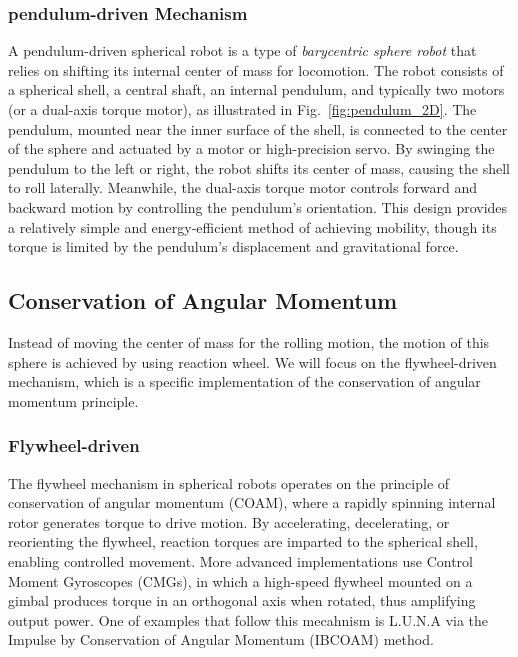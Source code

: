 \documentclass[english, bachelor, utf8]{base/thesis_telematics}
\begin{document}
\subsubsection{pendulum-driven Mechanism}
A pendulum-driven spherical robot is a type of \textit{barycentric sphere robot} that relies on shifting its internal center of mass for locomotion. 
The robot consists of a spherical shell, a central shaft, an internal pendulum, and typically two motors (or a dual-axis torque motor), as illustrated in Fig.~\ref{fig:pendulum_2D}. 
The pendulum, mounted near the inner surface of the shell, is connected to the center of the sphere and actuated by a motor or high-precision servo. 
By swinging the pendulum to the left or right, the robot shifts its center of mass, causing the shell to roll laterally. 
Meanwhile, the dual-axis torque motor controls forward and backward motion by controlling the pendulum’s orientation. 
This design provides a relatively simple and energy-efficient method of achieving mobility, though its torque is limited by the pendulum’s displacement and gravitational force.\cite{pendulum_sphere,Pendulum_Driven_Spherical_Robot,roboball}


\subsection{Conservation of Angular Momentum}
Instead of moving the center of mass for the rolling motion, the motion of this sphere is achieved by using reaction wheel. 
We will focus on the flywheel-driven mechanism, which is a specific implementation of the conservation of angular momentum principle.\cite{Aminata}
\subsubsection{Flywheel-driven}
The flywheel mechanism in spherical robots operates on the principle of conservation of angular momentum (COAM), where a rapidly spinning internal rotor generates torque to drive motion. By accelerating, decelerating, or reorienting the flywheel, reaction torques are imparted to the spherical shell, enabling controlled movement.
More advanced implementations use Control Moment Gyroscopes (CMGs), in which a high-speed flywheel mounted on a gimbal produces torque in an orthogonal axis when rotated, thus amplifying output power.
One of examples that follow this mecahnism is L.U.N.A\cite{luna} via the Impulse by Conservation of Angular Momentum (IBCOAM) method.
\end{document}
